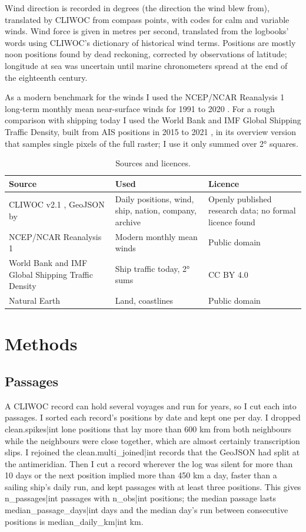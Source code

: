 \documentclass[11pt,a4paper]{article}
\begin{document}
Wind direction is recorded in degrees (the direction the wind blew from), translated by CLIWOC from compass points, with codes for calm and variable winds. Wind force is given in metres per second, translated from the logbooks' words using CLIWOC's dictionary of historical wind terms. Positions are mostly noon positions found by dead reckoning, corrected by observations of latitude; longitude at sea was uncertain until marine chronometers spread at the end of the eighteenth century.

As a modern benchmark for the winds I used the NCEP/NCAR Reanalysis 1 long-term monthly mean near-surface winds for 1991 to 2020 \citep{kalnay1996}. For a rough comparison with shipping today I used the World Bank and IMF Global Shipping Traffic Density, built from AIS positions in 2015 to 2021 \citep{cerdeiro2020}, in its overview version that samples single pixels of the full raster; I use it only summed over 2° squares.

\begin{table}[tbp]\centering\small\caption{Sources and licences.}\label{tab:sources}
\begin{tabular}{>{\raggedright\arraybackslash}p{4.2cm}>{\raggedright\arraybackslash}p{6.8cm}>{\raggedright\arraybackslash}p{3.4cm}}\toprule Source & Used & Licence\\\midrule
CLIWOC v2.1 \citep{garciaherrera2005}, GeoJSON by \citet{correoso} & Daily positions, wind, ship, nation, company, archive & Openly published research data; no formal licence found\\
NCEP/NCAR Reanalysis 1 \citep{kalnay1996} & Modern monthly mean winds & Public domain\\
World Bank and IMF Global Shipping Traffic Density \citep{cerdeiro2020} & Ship traffic today, 2° sums & CC BY 4.0\\
Natural Earth & Land, coastlines & Public domain\\
\bottomrule\end{tabular}\end{table}

\section{Methods}
\subsection{Passages}
A CLIWOC record can hold several voyages and run for years, so I cut each into passages. I sorted each record's positions by date and kept one per day. I dropped {{clean.spikes|int}} lone positions that lay more than 600 km from both neighbours while the neighbours were close together, which are almost certainly transcription slips. I rejoined the {{clean.multi_joined|int}} records that the GeoJSON had split at the antimeridian. Then I cut a record wherever the log was silent for more than 10 days or the next position implied more than 450 km a day, faster than a sailing ship's daily run, and kept passages with at least three positions. This gives {{n_passages|int}} passages with {{n_obs|int}} positions; the median passage lasts {{median_passage_days|int}} days and the median day's run between consecutive positions is {{median_daily_km|int}} km.
\end{document}
